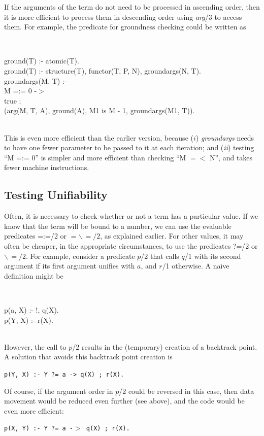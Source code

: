 If the arguments of the term do not need to be processed in ascending
order, then it is more efficient to process them in descending order using
{\em arg}/3 to access them.
For example, the predicate for groundness checking could be written as\\
\begin{minipage}{\textwidth} \tt\centering
\begin{tabbing}
ground(T) :- atomic(T). \\
ground(T) :- structure(T), functor(T, P, N), groundargs(N, T). \\
groundargs(M, T) :- \\
       M =:= 0 -$>$ \\
            true ; \\
            (arg(M, T, A), ground(A), M1 is M - 1, groundargs(M1, T)).
\end{tabbing}
\end{minipage} \\
This is even more efficient than the earlier version, because ($i$)
{\em groundargs} needs to have one fewer parameter to be passed to it at
each iteration; and ({\em ii}) testing ``M =:= 0'' is simpler and more
efficient than checking ``M $=<$ N'', and takes fewer machine instructions.

\subsection{Testing Unifiability}

Often, it is necessary to check whether or not a term has a particular value.
If we know that the term will be bound to a number, we can use the
evaluable predicates =:=/2 or $=\backslash\,=/2$, as explained earlier.
For other values, it may often be cheaper, in the appropriate circumstances,
to use the predicates ?=/2 or $\backslash\,=/2$.
For example, consider a predicate $p$/2 that calls $q$/1
with its second argument if its first argument unifies with $a$,
and $r$/1 otherwise.
A na\"{\i}ve definition might be\\
\begin{minipage}{\textwidth} \tt\centering
\begin{tabbing}
p(a, X) :- !, q(X). \\
p(Y, X) :- r(X).
\end{tabbing}
\end{minipage} \\
However, the call to $p$/2 results in the (temporary) creation of a
backtrack point.
A solution that avoids this backtrack point creation is
\begin{center}
{\tt p(Y, X) :- Y ?= a -> q(X) ; r(X).}
\end{center}
Of course, if the argument order in $p$/2 could be reversed in this case,
then data movement would be reduced even further (see above), and
the code would be even more efficient:
\begin{center}
{\tt p(X, Y) :- Y ?= a -$>$ q(X) ; r(X).}
\end{center}

